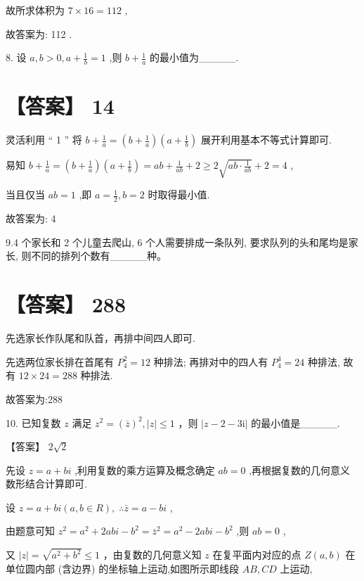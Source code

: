 \documentclass[10pt]{article}
\begin{document}
故所求体积为 \(7 \times  {16} = {112}\) ,

故答案为: 112 .

8. 设 \(a,b > 0,a + \frac{1}{b} = 1\) ,则 \(b + \frac{1}{a}\) 的最小值为\_\_\_\_\_.

\section*{【答案】 14}

灵活利用 “ 1 ” 将 \(b + \frac{1}{a} = \left( {b + \frac{1}{a}}\right) \left( {a + \frac{1}{b}}\right)\) 展开利用基本不等式计算即可.

易知 \(b + \frac{1}{a} = \left( {b + \frac{1}{a}}\right) \left( {a + \frac{1}{b}}\right)  = {ab} + \frac{1}{ab} + 2 \geq  2\sqrt{{ab} \cdot  \frac{1}{ab}} + 2 = 4\) ,

当且仅当 \({ab} = 1\) ,即 \(a = \frac{1}{2},b = 2\) 时取得最小值.

故答案为: 4

9.4 个家长和 2 个儿童去爬山, 6 个人需要排成一条队列, 要求队列的头和尾均是家长, 则不同的排列个数有\_\_\_\_\_种。

\section*{【答案】 288}

先选家长作队尾和队首，再排中间四人即可.

先选两位家长排在首尾有 \({P}_{4}^{2} = {12}\) 种排法; 再排对中的四人有 \({P}_{4}^{4} = {24}\) 种排法, 故有 \({12} \times  {24} = {288}\) 种排法.

故答案为:288

10. 已知复数 \(z\) 满足 \({z}^{2} = {\left( \bar{z}\right) }^{2},\left| z\right|  \leq  1\) ，则 \(\left| {z - 2 - {3\mathrm{i}}}\right|\) 的最小值是\_\_\_\_\_.

【答案】 \(2\sqrt{2}\)

先设 \(z = a + {bi}\) ,利用复数的乘方运算及概念确定 \({ab} = 0\) ,再根据复数的几何意义数形结合计算即可.

设 \(z = a + {bi}\left( {a,b \in  R}\right) ,\;\therefore \bar{z} = a - {bi}\) ,

由题意可知 \({z}^{2} = {a}^{2} + {2abi} - {b}^{2} = {\bar{z}}^{2} = {a}^{2} - {2abi} - {b}^{2}\) ,则 \({ab} = 0\) ,

又 \(\left| z\right|  = \sqrt{{a}^{2} + {b}^{2}} \leq  1\) ，由复数的几何意义知 \(z\) 在复平面内对应的点 \(Z\left( {a,b}\right)\) 在单位圆内部 (含边界) 的坐标轴上运动,如图所示即线段 \({AB},{CD}\) 上运动,
\end{document}
